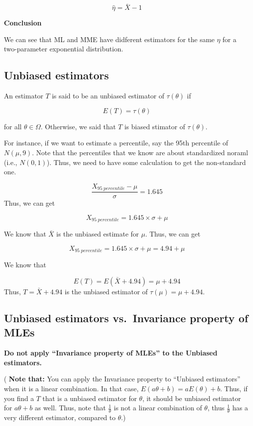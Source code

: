 \documentclass[]{book}
\begin{document}
\[\hat{\eta}=\bar{X}-1\]

\textbf{Conclusion}

We can see that ML and MME have didferent estimators for the same \(\eta\) for a two-parameter exponential distribution.

\hypertarget{unbiased-estimators}{%
\subsection{Unbiased estimators}\label{unbiased-estimators}}

An estimator \(T\) is said to be an unbiased estimator of \(\tau(\theta)\) if

\[E(T)=\tau(\theta)\]

for all \(\theta \in \Omega\). Otherwise, we said that \(T\) is biased stimator of \(\tau(\theta)\).

For instance, if we want to estimate a percentile, say the 95th percentile of \(N(\mu,9)\). Note that the percentiles that we know are about standardized noraml (i.e., \(N(0,1)\)). Thus, we need to have some calculation to get the non-standard one.

\[\frac{X_{95 \; percentile}-\mu}{\sigma}=1.645\]
Thus, we can get

\[X_{95 \; percentile}=1.645 \times \sigma +\mu\]

We know that \(\bar{X}\) is the unbiased estimate for \(\mu\). Thus, we can get

\[X_{95 \; percentile}=1.645 \times \sigma +\mu=4.94+\mu\]

We know that

\[E(T)=E(\bar{X}+4.94)=\mu+4.94\]
Thus, \(T=\bar{X}+4.94\) is the unbiased estimator of \(\tau(\mu)=\mu+4.94\).

\hypertarget{unbiased-estimators-vs.-invariance-property-of-mles}{%
\subsection{Unbiased estimators vs.~Invariance property of MLEs}\label{unbiased-estimators-vs.-invariance-property-of-mles}}

\textbf{Do not apply ``Invariance property of MLEs'' to the Unbiased estimators.}

( \textbf{Note that:} You can apply the Invariance property to ``Unbiased estimators'' when it is a linear combination. In that case, \(E(a\theta+b)=aE(\theta)+b\). Thus, if you find a \(T\) that is a unbiased estimator for \(\theta\), it should be unbiased estimator for \(a\theta+b\) as well. Thus, note that \(\frac{1}{\theta}\) is not a linear combination of \(\theta\), thus \(\frac{1}{\theta}\) has a very different estimator, compared to \(\theta\).)
\end{document}
